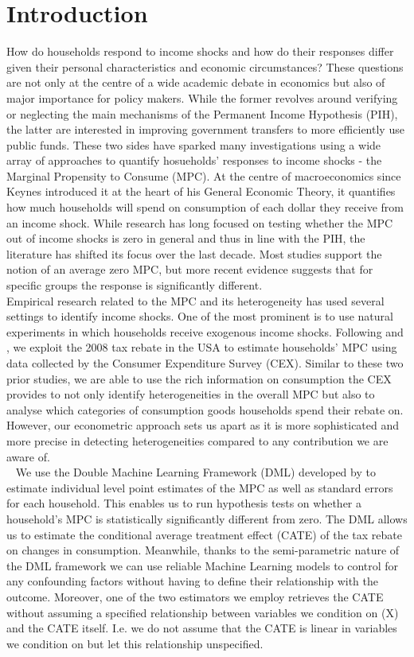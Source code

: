 \section{Introduction} \label{sec:intro}
How do households respond to income shocks and how do their responses differ given their personal characteristics and economic circumstances? These questions are not only at the centre of a wide academic debate in economics but also of major importance for policy makers. While the former revolves around verifying or neglecting the main mechanisms of the Permanent Income Hypothesis (PIH), the latter are interested in improving government transfers to more efficiently use public funds. These two sides have sparked many investigations using a wide array of approaches to quantify hosueholds' responses to income shocks - the Marginal Propensity to Consume (MPC). At the centre of macroeconomics since Keynes introduced it at the heart of his General Economic Theory, it quantifies how much households will spend on consumption of each dollar they receive from an income shock. While research has long focused on testing whether the MPC out of income shocks is zero in general and thus in line with the PIH, the literature has shifted its focus over the last decade. Most studies support the notion of an average zero MPC, but more recent evidence suggests that for specific groups the response is significantly different. \\
Empirical research related to the MPC and its heterogeneity has used several settings to identify income shocks. One of the most prominent is to use natural experiments in which households receive exogenous income shocks. Following \cite{parker_etal_13} and \cite{ms_14}, we exploit the 2008 tax rebate in the USA to estimate households' MPC using data collected by the Consumer Expenditure Survey (CEX). Similar to these two prior studies, we are able to use the rich information on consumption the CEX provides to not only identify heterogeneities in the overall MPC but also to analyse which categories of consumption goods households spend their rebate on. However, our econometric approach sets us apart as it is more sophisticated and more precise in detecting heterogeneities compared to any contribution we are aware of. \\ 
We use the Double Machine Learning Framework (DML) developed by \cite{DML2017} to estimate individual level point estimates of the MPC as well as standard errors for each household. This enables us to run hypothesis tests on whether a household's MPC is statistically significantly different from zero. The DML allows us to estimate the conditional average treatment effect (CATE) of the tax rebate on changes in consumption. Meanwhile, thanks to the semi-parametric nature of the DML framework we can use reliable Machine Learning models to control for any confounding factors without having to define their relationship with the outcome. Moreover, one of the two estimators we employ retrieves the CATE without assuming a specified relationship between variables we condition on (X) and the CATE itself. I.e. we do not assume that the CATE is linear in variables we condition on but let this relationship unspecified. \\
